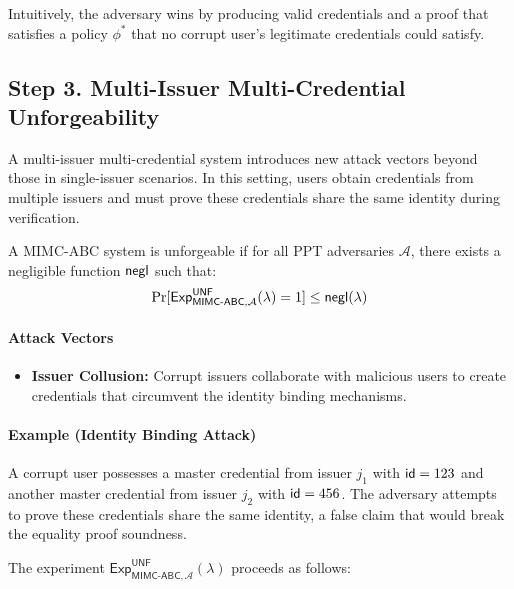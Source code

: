\noindent Intuitively, the adversary wins by producing valid credentials and a proof that satisfies a policy $\phi^*$ that no corrupt user's legitimate credentials could satisfy.






\subsection{Step 3. Multi-Issuer Multi-Credential Unforgeability}

A multi-issuer multi-credential system introduces new attack vectors beyond those in single-issuer scenarios. In this setting, users obtain credentials from multiple issuers and must prove these credentials share the same identity during verification.

\begin{definition}[Unforgeability]
A MIMC-ABC system is unforgeable if for all PPT adversaries $\mathcal{A}$, there exists a negligible function $\mathsf{negl}$ such that:
\[
\Pr[\mathsf{Exp}^{\mathsf{UNF}}_{\mathsf{MIMC\text{-}ABC}, \mathcal{A}}(\lambda) = 1] \leq \mathsf{negl}(\lambda)
\]
\end{definition}

\paragraph{Attack Vectors}
\begin{itemize}
        
    \item \textbf{Issuer Collusion:} Corrupt issuers collaborate with malicious users to create credentials that circumvent the identity binding mechanisms.
\end{itemize}

\paragraph{Example (Identity Binding Attack)} A corrupt user possesses a master credential from issuer $j_1$ with $\mathsf{id}=123$ and another master credential from issuer $j_2$ with $\mathsf{id}=456$. The adversary attempts to prove these credentials share the same identity, a false claim that would break the equality proof soundness.

\noindent The experiment $\mathsf{Exp}^{\mathsf{UNF}}_{\mathsf{MIMC\text{-}ABC}, \mathcal{A}}(\lambda)$ proceeds as follows:

